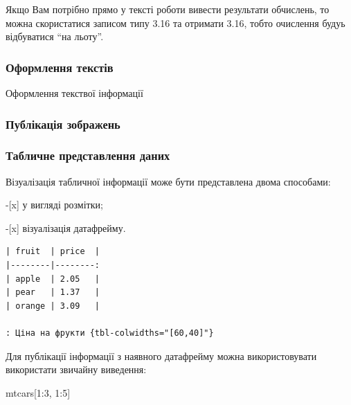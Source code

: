 \documentclass[
  letterpaper,
  DIV=11,
  numbers=noendperiod]{scrartcl}
\newenvironment{Shaded}{\begin{snugshade}}{\end{snugshade}}
\newcommand{\DecValTok}[1]{\textcolor[rgb]{0.68,0.00,0.00}{#1}}
\newcommand{\NormalTok}[1]{\textcolor[rgb]{0.00,0.23,0.31}{#1}}
\newcommand{\SpecialCharTok}[1]{\textcolor[rgb]{0.37,0.37,0.37}{#1}}
\begin{document}
Якщо Вам потрібно прямо у тексті роботи вивести результати обчислень, то
можна скористатися записом типу 3.16 та отримати 3.16, тобто очислення
будуь відбуватися ``на льоту''.

\hypertarget{ux43eux444ux43eux440ux43cux43bux435ux43dux43dux44f-ux442ux435ux43aux441ux442ux456ux432}{%
\subsubsection{Оформлення
текстів}\label{ux43eux444ux43eux440ux43cux43bux435ux43dux43dux44f-ux442ux435ux43aux441ux442ux456ux432}}

Оформлення текствої інформації

\hypertarget{ux43fux443ux431ux43bux456ux43aux430ux446ux456ux44f-ux437ux43eux431ux440ux430ux436ux435ux43dux44c}{%
\subsubsection{Публікація
зображень}\label{ux43fux443ux431ux43bux456ux43aux430ux446ux456ux44f-ux437ux43eux431ux440ux430ux436ux435ux43dux44c}}

\hypertarget{ux442ux430ux431ux43bux438ux447ux43dux435-ux43fux440ux435ux434ux441ux442ux430ux432ux43bux435ux43dux43dux44f-ux434ux430ux43dux438ux445}{%
\subsubsection{Табличне представлення
даних}\label{ux442ux430ux431ux43bux438ux447ux43dux435-ux43fux440ux435ux434ux441ux442ux430ux432ux43bux435ux43dux43dux44f-ux434ux430ux43dux438ux445}}

Візуалізація табличної інформації може бути представлена двома
способами:

-{[}x{]} у вигляді розмітки;

-{[}x{]} візуалізація датафрейму.

\begin{verbatim}
| fruit  | price  |
|--------|--------:
| apple  | 2.05   |
| pear   | 1.37   |
| orange | 3.09   |

: Ціна на фрукти {tbl-colwidths="[60,40]"}
\end{verbatim}

Для публікації інформації з наявного датафрейму можна використовувати
використати звичайну виведення:

\begin{Shaded}
\begin{Highlighting}[numbers=left,,]
\NormalTok{  mtcars[}\DecValTok{1}\SpecialCharTok{:}\DecValTok{3}\NormalTok{, }\DecValTok{1}\SpecialCharTok{:}\DecValTok{5}\NormalTok{]}
\end{Highlighting}
\end{Shaded}
\end{document}
